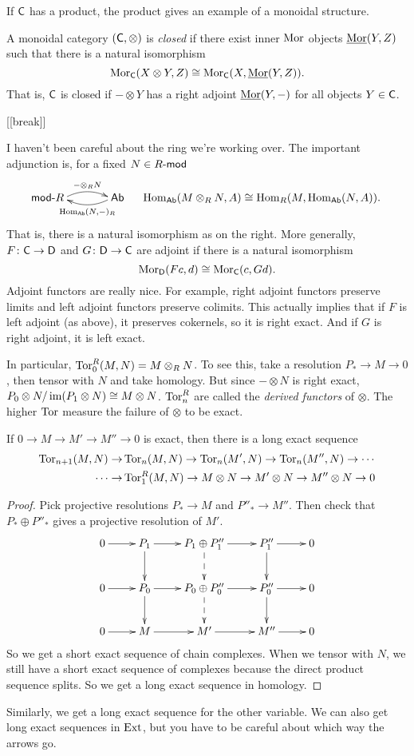 \begin{example}
 If $\C$ has a product, the product gives an example of a monoidal structure.
\end{example}

A monoidal category $(\C,\otimes)$ is \emph{closed} if there exist inner $\mor$ objects $\umor(Y,Z)$ such that there is a natural isomorphism
\[
 \mor_\C(X\otimes Y,Z)\cong \mor_\C(X,\umor(Y,Z)).
\]
That is, $\C$ is closed if $-\otimes Y$ has a right adjoint $\umor(Y,-)$ for all objects $Y\in \C$.

[[break]]

I haven't been careful about the ring we're working over. The important adjunction is, for a fixed $N\in R\mod$
\[\qquad\xymatrix @C+1pc{
 \llap{$\rmod R$} \ar@/^/[r]^-{-\otimes_R N} & \rlap{$\ab$} \ar@/^/[l]^{\hom_{\ab} (N,-)_R}
}\qquad
\hom_{\ab}(M\otimes_R N,A)\cong \hom_R(M,\hom_{\ab}(N,A)).\]
That is, there is a natural isomorphism as on the right. More generally, $F\colon \C\to \D$ and $G\colon \D\to \C$ are adjoint if there is a natural isomorphism
\[
 \mor_\D(F c,d)\cong \mor_\C(c,G d).
\]
Adjoint functors are really nice. For example, right adjoint functors preserve limits and left adjoint functors preserve colimits. This actually implies that if $F$ is left adjoint (as above), it preserves cokernels, so it is right exact. And if $G$ is right adjoint, it is left exact.

In particular, $\tor_0^R(M,N)=M\otimes_R N$. To see this, take a resolution $P_*\to M\to 0$, then tensor with $N$ and take homology. But since $-\otimes N$ is right exact, $P_0\otimes N/\im(P_1\otimes N)\cong M\otimes N$. $\tor_n^R$ are called the \emph{derived functors} of $\otimes$. The higher $\tor$ measure the failure of $\otimes$ to be exact.
\begin{lemma}
 If $0\to M\to M'\to M''\to 0$ is exact, then there is a long exact sequence 
 \begin{align*}
  \tor_{n+1}(M,N)\to &\tor_n(M,N)\to \tor_n(M',N)\to \tor_n(M'',N)\to \cdots \\
  \cdots \to& \tor_1^R(M,N)\to M\otimes N\to M'\otimes N\to M''\otimes N\to 0
 \end{align*}
\end{lemma}
\begin{proof}
 Pick projective resolutions $P_*\to M$ and $P''_*\to M''$. Then check that $P_*\oplus P''_*$ gives a projective resolution of $M'$.
 \[\xymatrix{
  0\ar[r] & P_1\ar[r]\ar[d] & P_1\oplus P''_1\ar[r]\ar@{-->}[d] & P_1''\ar[r]\ar[d] & 0 \\
  0\ar[r] & P_0\ar[r]\ar[d] & P_0\oplus P''_0\ar[r]\ar@{-->}[d] & P_0''\ar[r]\ar[d] & 0 \\
  0\ar[r] & M\ar[r] & M'\ar[r] & M''\ar[r] & 0 
 }\]
 So we get a short exact sequence of chain complexes. When we tensor with $N$, we still have a short exact sequence of complexes because the direct product sequence splits. So we get a long exact sequence in homology.
\end{proof}
Similarly, we get a long exact sequence for the other variable. We can also get long exact sequences in $\ext$, but you have to be careful about which way the arrows go.

